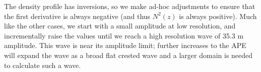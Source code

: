 \documentclass[letterpaper]{article}
\begin{document}
The density profile has inversions, so we make ad-hoc adjustments to ensure that the first derivative is always negative (and thus $N^2(z)$ is always positive).
Much like the other cases, we start with a small amplitude at low resolution, and incrementally raise the values until we reach a high resolution wave of 35.3 m amplitude.
This wave is near its amplitude limit; further increases to the APE will expand the wave as a broad flat crested wave and a larger domain is needed to calculate such a wave.



\end{document}
